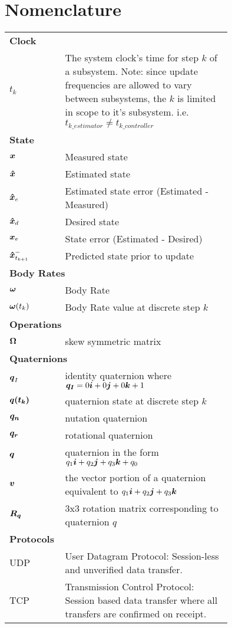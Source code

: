 \vspace*{0.5in}
    \thispagestyle{plain}
    \chapter*{Nomenclature}

\begin{tabular}{lp{0.75\linewidth}}
  \multicolumn{2}{l}{\textbf{Clock}} \\
  $t_k$ & The system clock's time for step $k$ of a subsystem.  Note: since update frequencies are allowed to vary between subsystems, the $k$ is limited in scope to it's subsystem.  i.e. $t_{k\_estimator} \ne t_{k\_controller}$ \\

  \multicolumn{2}{l}{\textbf{State}} \\
  $\boldsymbol{x}$ & Measured state \\
  $\boldsymbol{\hat{x}}$ & Estimated state \\
  $\boldsymbol{\hat{x}}_e$ & Estimated state error (Estimated - Measured)\\
  $\boldsymbol{\hat{x}}_d$ & Desired state \\
  $\boldsymbol{x}_e$ & State error (Estimated - Desired) \\
  $\boldsymbol{\hat{x}}_{t_{k+1}}^-$ & Predicted state prior to update \\

  \multicolumn{2}{l}{\textbf{Body Rates}} \\
  $\boldsymbol{\omega}$ & Body Rate \\
  $\boldsymbol{\omega}(t_k)$ & Body Rate value at discrete step $k$\\


  \multicolumn{2}{l}{\textbf{Operations}} \\
  $\boldsymbol{\Omega}$ & skew symmetric matrix \\

  \multicolumn{2}{l}{\textbf{Quaternions}} \\
  $\boldsymbol{q}_I$ & identity quaternion where $\boldsymbol{q_I} = 0\boldsymbol{i}+0\boldsymbol{j}+0\boldsymbol{k}+1$ \\
  $\boldsymbol{q(t_k)}$ & quaternion state at discrete step $k$ \\
  $\boldsymbol{q_n}$ & nutation quaternion \\
  $\boldsymbol{q_r}$ & rotational quaternion \\
  $\boldsymbol{q}$ & quaternion in the form $q_1\boldsymbol{i}+q_2\boldsymbol{j}+q_3\boldsymbol{k}+q_0$ \\
  $\boldsymbol{v}$ & the vector portion of a quaternion equivalent to $q_1\boldsymbol{i}+q_2\boldsymbol{j}+q_3\boldsymbol{k}$ \\
  $\boldsymbol{R_q}$ & 3x3 rotation matrix corresponding to quaternion $q$ \\

  \multicolumn{2}{l}{\textbf{Protocols}} \\
  UDP & User Datagram Protocol: Session-less and unverified data transfer. \\
  TCP & Transmission Control Protocol: Session based data transfer where all transfers are confirmed on receipt. \\
\end{tabular}



